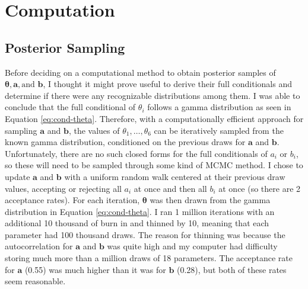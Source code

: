 \documentclass{article}
\begin{document}
\section{Computation}

\subsection{Posterior Sampling}

Before deciding on a computational method to obtain posterior samples of $\boldsymbol{\theta}, \mathbf{a}, \text{and } \mathbf{b}$, I thought it might prove useful to derive their full conditionals and determine if there were any recognizable distributions among them. I was able to conclude that the full conditional of $\theta_i$ follows a gamma distribution as seen in Equation \ref{eq:cond-theta}. Therefore, with a computationally efficient approach for sampling $\mathbf{a}$ and $\mathbf{b}$, the values of $\theta_1, \hdots, \theta_6$ can be iteratively sampled from the known gamma distribution, conditioned on the previous draws for $\mathbf{a}$ and $\mathbf{b}$. Unfortunately, there are no such closed forms for the full conditionals of $a_i$ or $b_i$, so these will need to be sampled through some kind of MCMC method. I chose to update $\mathbf{a}$ and $\mathbf{b}$ with a uniform random walk centered at their previous draw values, accepting or rejecting all $a_i$ at once and then all $b_i$ at once (so there are 2 acceptance rates). For each iteration, $\boldsymbol{\theta}$ was then drawn from the gamma distribution in Equation \ref{eq:cond-theta}. I ran 1 million iterations with an additional 10 thousand of burn in and thinned by 10, meaning that each parameter had 100 thousand draws. The reason for thinning was because the autocorrelation for $\mathbf{a}$ and $\mathbf{b}$ was quite high and my computer had difficulty storing much more than a million draws of 18 parameters. The acceptance rate for $\mathbf{a}$ (0.55) was much higher than it was for $\mathbf{b}$ (0.28), but both of these rates seem reasonable. 
\end{document}
